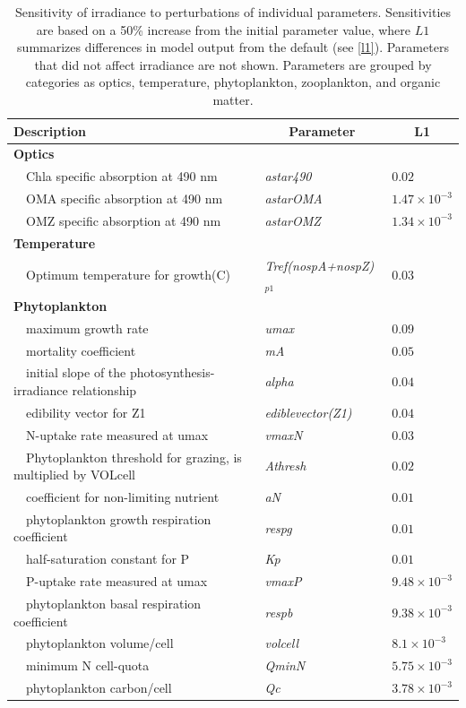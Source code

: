 \documentclass[letterpaper,12pt,oneside]{article}\usepackage[]{graphicx}\usepackage[]{color}
\begin{document}
\begin{table}[!tbp]
{\footnotesize
\caption{Sensitivity of irradiance to perturbations of individual parameters.  Sensitivities are based on a 50\% increase from the initial parameter value, where $L1$ summarizes differences in model output from the default (see \cref{l1}).  Parameters that did not affect irradiance are not shown.  Parameters are grouped by categories as optics, temperature, phytoplankton, zooplankton, and organic matter.\label{tab:irrsens}} 
\begin{center}
\begin{tabular}{lll}
\hline\hline
\multicolumn{1}{l}{Description}&\multicolumn{1}{c}{Parameter}&\multicolumn{1}{c}{L1}\tabularnewline
\hline
{\bfseries Optics}&&\tabularnewline
~~Chla specific absorption at 490 nm&\textit{astar490}&$0.02$\tabularnewline
~~OMA specific absorption at 490 nm&\textit{astarOMA}&$1.47\times 10^{-3}$\tabularnewline
~~OMZ specific absorption at 490 nm&\textit{astarOMZ}&$1.34\times 10^{-3}$\tabularnewline
\hline
{\bfseries Temperature}&&\tabularnewline
~~Optimum temperature for growth(C)&\textit{Tref(nospA+nospZ)$_{p1}$}&$0.03$\tabularnewline
\hline
{\bfseries Phytoplankton}&&\tabularnewline
~~maximum growth rate&\textit{umax}&$0.09$\tabularnewline
~~mortality coefficient&\textit{mA}&$0.05$\tabularnewline
~~initial slope of the photosynthesis-irradiance relationship&\textit{alpha}&$0.04$\tabularnewline
~~edibility vector for Z1&\textit{ediblevector(Z1)}&$0.04$\tabularnewline
~~N-uptake rate measured at umax&\textit{vmaxN}&$0.03$\tabularnewline
~~Phytoplankton threshold for grazing, is multiplied by VOLcell&\textit{Athresh}&$0.02$\tabularnewline
~~coefficient for non-limiting nutrient&\textit{aN}&$0.01$\tabularnewline
~~phytoplankton growth respiration coefficient&\textit{respg}&$0.01$\tabularnewline
~~half-saturation constant for P&\textit{Kp}&$0.01$\tabularnewline
~~P-uptake rate measured at umax&\textit{vmaxP}&$9.48\times 10^{-3}$\tabularnewline
~~phytoplankton basal respiration coefficient&\textit{respb}&$9.38\times 10^{-3}$\tabularnewline
~~phytoplankton volume/cell&\textit{volcell}&$8.1\times 10^{-3}$\tabularnewline
~~minimum N cell-quota&\textit{QminN}&$5.75\times 10^{-3}$\tabularnewline
~~phytoplankton carbon/cell&\textit{Qc}&$3.78\times 10^{-3}$\tabularnewline

\end{tabular}
\end{center}}
\end{table}
\end{document}
